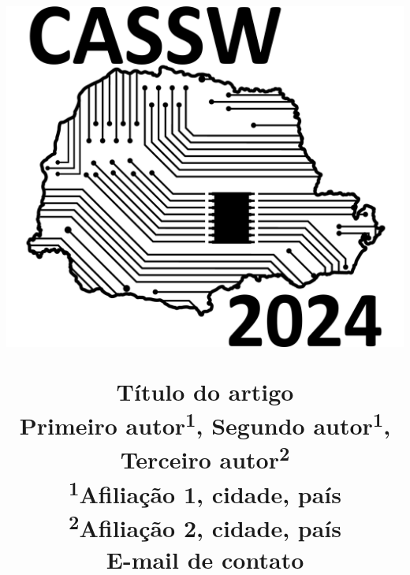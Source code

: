 \renewcommand{\thesubsection}{\Alph{subsection}}
\renewcommand{\thesection}{\Roman{section}}
\renewcommand{\figurename}{Fig.}
\renewcommand{\tablename}{TABELA}
\usepackage{geometry}
 \geometry{
     a4paper,
     left=16mm,
     top=19mm,
     right=16mm,
     bottom=25.4mm
 }
\graphicspath{{Figuras/}}
\title{
    \begin{minipage}[c]{0.3\textwidth} 
          \includegraphics[width=\textwidth]{Semicro_title.png} 
    \end{minipage}\begin{minipage}[c]{0.7\textwidth} 
             \begin{center}
                \Huge
                Título do artigo\\
                \vspace{20pt}
                \Large
                  Primeiro autor\textsuperscript{1}, Segundo autor\textsuperscript{1}, Terceiro autor\textsuperscript{2} \\
                  \normalsize
                  \textsuperscript{1}Afiliação 1, cidade, país \\
                  \textsuperscript{2}Afiliação 2, cidade, país \\
                  E-mail de contato
             \end{center}
    \end{minipage}
}

\date{\vspace{-8em}}
\setlength\columnsep{2em}

